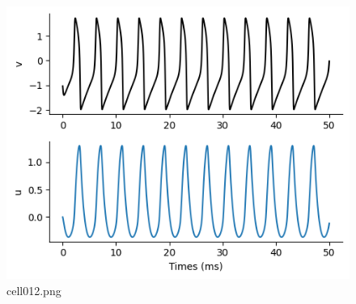 \begin{figure}[ht]
	\centering
	\includegraphics[scale=0.8, max width=\linewidth]{./fig/neuron-model/fhn/cell012.png}
	\caption{cell012.png}
	\label{cell012.png}
\end{figure}